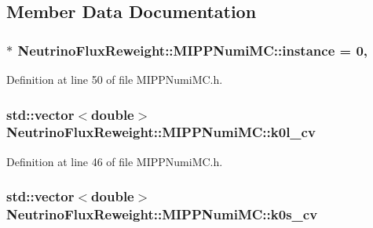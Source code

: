 \subsection{Member Data Documentation}
\hypertarget{class_neutrino_flux_reweight_1_1_m_i_p_p_numi_m_c_a1f5a2a2f7f56628ea47b681f5a954c3f}{
\subsubsection[{instance}]{ $\ast$ Neutrino\-Flux\-Reweight\-::\-M\-I\-P\-P\-Numi\-M\-C\-::instance = 0\hspace{0.3cm}{\ttfamily [static]}, {\ttfamily [private]}}}\label{class_neutrino_flux_reweight_1_1_m_i_p_p_numi_m_c_a1f5a2a2f7f56628ea47b681f5a954c3f}


Definition at line 50 of file M\-I\-P\-P\-Numi\-M\-C.\-h.

\hypertarget{class_neutrino_flux_reweight_1_1_m_i_p_p_numi_m_c_a5bca60d2733426f0f113f9be6035cef4}{
\subsubsection[{k0l\-\_\-cv}]{\setlength{\rightskip}{0pt plus 5cm}std\-::vector$<$double$>$ Neutrino\-Flux\-Reweight\-::\-M\-I\-P\-P\-Numi\-M\-C\-::k0l\-\_\-cv\hspace{0.3cm}{\ttfamily [private]}}}\label{class_neutrino_flux_reweight_1_1_m_i_p_p_numi_m_c_a5bca60d2733426f0f113f9be6035cef4}


Definition at line 46 of file M\-I\-P\-P\-Numi\-M\-C.\-h.

\hypertarget{class_neutrino_flux_reweight_1_1_m_i_p_p_numi_m_c_ac9c4d06a4bcf4856097b787bffc12251}{
\subsubsection[{k0s\-\_\-cv}]{\setlength{\rightskip}{0pt plus 5cm}std\-::vector$<$double$>$ Neutrino\-Flux\-Reweight\-::\-M\-I\-P\-P\-Numi\-M\-C\-::k0s\-\_\-cv\hspace{0.3cm}{\ttfamily [private]}}}\label{class_neutrino_flux_reweight_1_1_m_i_p_p_numi_m_c_ac9c4d06a4bcf4856097b787bffc12251}


